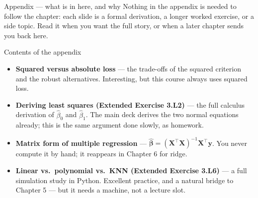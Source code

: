 \documentclass[aspectratio=169,11pt]{beamer}
\begin{document}
\begin{frame}{Appendix --- what is in here, and why}
  \small
  Nothing in the appendix is needed to follow the chapter: each slide is a
  formal derivation, a longer worked exercise, or a side topic. Read it when
  you want the full story, or when a later chapter sends you back here.
  \begin{block}{Contents of the appendix}
    \begin{itemize}
      \item \textbf{Squared versus absolute loss} --- the trade-offs of the squared criterion and the robust alternatives. Interesting, but this course always uses squared loss.
      \item \textbf{Deriving least squares (Extended Exercise 3.L2)} --- the full calculus derivation of $\hat\beta_0$ and $\hat\beta_1$. The main deck derives the two normal equations already; this is the same argument done slowly, as homework.
      \item \textbf{Matrix form of multiple regression} --- $\hat{\boldsymbol\beta}=(\mathbf{X}^\top\mathbf{X})^{-1}\mathbf{X}^\top\mathbf{y}$. You never compute it by hand; it reappears in Chapter 6 for ridge.
      \item \textbf{Linear vs.\ polynomial vs.\ KNN (Extended Exercise 3.L6)} --- a full simulation study in Python. Excellent practice, and a natural bridge to Chapter 5 --- but it needs a machine, not a lecture slot.
    \end{itemize}
  \end{block}
\end{frame}
\end{document}

